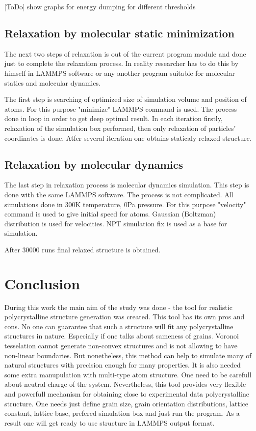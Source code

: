 \documentclass[12pt]{report}
\begin{document}
[ToDo] show graphs for energy dumping for different thresholds

\subsection{Relaxation by molecular static minimization}

The next two steps of relaxation is out of the current program module and done just to complete the relaxation process. In reality researcher has to do this by himself in LAMMPS software or any another program suitable for molecular statics and molecular dynamics.

The first step is searching of optimized size of simulation volume and position of atoms. For this purpose "minimize" LAMMPS command is used. The process done in loop in order to get deep optimal result. In each iteration firstly, relaxation of the simulation box performed, then only relaxation of particles' coordinates is done. Atfer several iteration one obtains staticaly relaxed structure.

\subsection{Relaxation by molecular dynamics}

The last step in relaxation process is molecular dynamics simulation. This step is done with the same LAMMPS software. The process is not complicated. All simulations done in 300K temperature, 0Pa pressure. For this purpose "velocity" command is used to give initial speed for atoms. Gaussian (Boltzman) distribution is used for velocities. NPT simulation fix is used as a base for simulation.

After 30000 runs final relaxed structure is obtained.

\section{Conclusion}

During this work the main aim of the study was done - the tool for realistic polycrystalline structure generation was created. This tool has its own pros and cons. No one can guarantee that such a structure will fit any polycrystalline structures in nature. Especially if one talks about sameness of grains. Voronoi tesselation cannot generate non-convex structures and is not allowing to have non-linear boundaries. But nonetheless, this method can help to simulate many of natural structures with precision enough for many properties. It is also needed some extra manupulation with multi-type atom structure. One need to be carefull about neutral charge of the system. Nevertheless, this tool provides very flexible and powerfull mechanism for obtaining close to experimental data polycrystalline structure. One needs just define grain size, grain orientation distributions, lattice constant, lattice base, prefered simulation box and just run the program. As a result one will get ready to use structure in LAMMPS output format.
\end{document}
